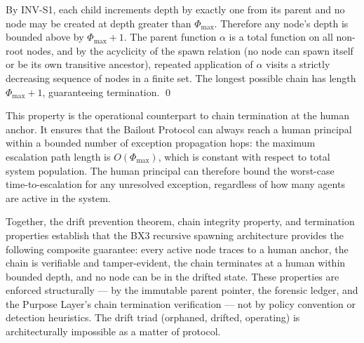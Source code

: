 \begin{Proof}
By INV-S1, each child increments depth by exactly one from its parent and no node may be created at depth greater than $\Phi_{\max}$. Therefore any node's depth is bounded above by $\Phi_{\max} + 1$. The parent function $\alpha$ is a total function on all non-root nodes, and by the acyclicity of the spawn relation (no node can spawn itself or be its own transitive ancestor), repeated application of $\alpha$ visits a strictly decreasing sequence of nodes in a finite set. The longest possible chain has length $\Phi_{\max} + 1$, guaranteeing termination. \qed
\end{Proof}

This property is the operational counterpart to chain termination at the human anchor. It ensures that the Bailout Protocol can always reach a human principal within a bounded number of exception propagation hops: the maximum escalation path length is $O(\Phi_{\max})$, which is constant with respect to total system population. The human principal can therefore bound the worst-case time-to-escalation for any unresolved exception, regardless of how many agents are active in the system.

Together, the drift prevention theorem, chain integrity property, and termination properties establish that the BX3 recursive spawning architecture provides the following composite guarantee: every active node traces to a human anchor, the chain is verifiable and tamper-evident, the chain terminates at a human within bounded depth, and no node can be in the drifted state. These properties are enforced structurally — by the immutable parent pointer, the forensic ledger, and the Purpose Layer's chain termination verification — not by policy convention or detection heuristics. The drift triad (orphaned, drifted, operating) is architecturally impossible as a matter of protocol.

\vfill
